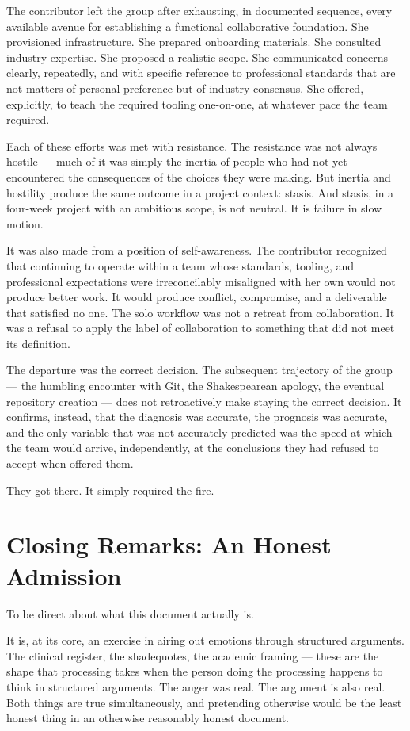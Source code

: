\documentclass[11pt,a4paper]{book}
\begin{document}
The contributor left the group after exhausting, in documented sequence, every available avenue for establishing a functional collaborative foundation. She provisioned infrastructure. She prepared onboarding materials. She consulted industry expertise. She proposed a realistic scope. She communicated concerns clearly, repeatedly, and with specific reference to professional standards that are not matters of personal preference but of industry consensus. She offered, explicitly, to teach the required tooling one-on-one, at whatever pace the team required.

Each of these efforts was met with resistance. The resistance was not always hostile --- much of it was simply the inertia of people who had not yet encountered the consequences of the choices they were making. But inertia and hostility produce the same outcome in a project context: stasis. And stasis, in a four-week project with an ambitious scope, is not neutral. It is failure in slow motion.

It was also made from a position of self-awareness. The contributor recognized that continuing to operate within a team whose standards, tooling, and professional expectations were irreconcilably misaligned with her own would not produce better work. It would produce conflict, compromise, and a deliverable that satisfied no one. The solo workflow was not a retreat from collaboration. It was a refusal to apply the label of collaboration to something that did not meet its definition.

The departure was the correct decision. The subsequent trajectory of the group --- the humbling encounter with Git, the Shakespearean apology, the eventual repository creation --- does not retroactively make staying the correct decision. It confirms, instead, that the diagnosis was accurate, the prognosis was accurate, and the only variable that was not accurately predicted was the speed at which the team would arrive, independently, at the conclusions they had refused to accept when offered them.

They got there. It simply required the fire.

\section{Closing Remarks: An Honest Admission}

To be direct about what this document actually is.

It is, at its core, an exercise in airing out emotions through structured arguments. The clinical register, the shadequotes, the academic framing --- these are the shape that processing takes when the person doing the processing happens to think in structured arguments. The anger was real. The argument is also real. Both things are true simultaneously, and pretending otherwise would be the least honest thing in an otherwise reasonably honest document.
\end{document}
